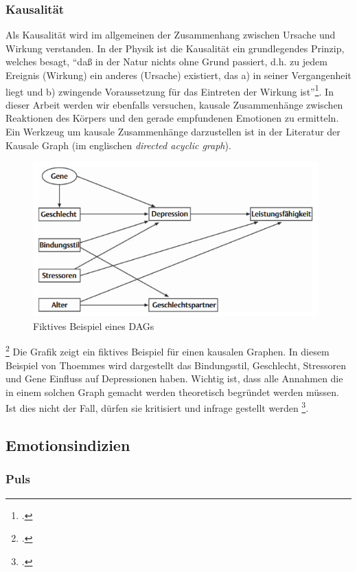 \subsubsection{Kausalität}
Als Kausalität wird im allgemeinen der Zusammenhang zwischen Ursache und Wirkung verstanden. In der Physik ist die Kausalität ein grundlegendes Prinzip, welches besagt, ``daß in der Natur nichts ohne Grund passiert, d.h. zu jedem Ereignis (Wirkung) ein anderes (Ursache) existiert, das a) in seiner Vergangenheit liegt und b) zwingende Voraussetzung für das Eintreten der Wirkung ist''\footcite{Sav18}.\newline
In dieser Arbeit werden wir ebenfalls versuchen, kausale Zusammenhänge zwischen Reaktionen des Körpers und den gerade empfundenen Emotionen zu ermitteln.
Ein Werkzeug um kausale Zusammenhänge darzustellen ist in der Literatur der Kausale Graph (im englischen \textit{directed acyclic graph}).
\begin{figure}[h]
	\centering
	\includegraphics[width=11cm]{Bilder/dag.png}
	\caption[Fiktives Beispiel eines DAGs]{Fiktives Beispiel eines DAGs\footnotemark}
\end{figure}
\footcite[Vgl.][Kausale Graphen - DAGs]{Tho11}
Die Grafik zeigt ein fiktives Beispiel für einen kausalen Graphen. In diesem Beispiel von Thoemmes wird dargestellt das Bindungsstil, Geschlecht, Stressoren und Gene Einfluss auf Depressionen haben. Wichtig ist, dass alle Annahmen die in einem solchen Graph gemacht werden theoretisch begründet werden müssen. Ist dies nicht der Fall, dürfen sie kritisiert und infrage gestellt werden \footcite[Vgl. ][S.3 Kausale Graphen - DAGs]{Tho11}.
\subsection{Emotionsindizien}
\subsubsection{Puls}
